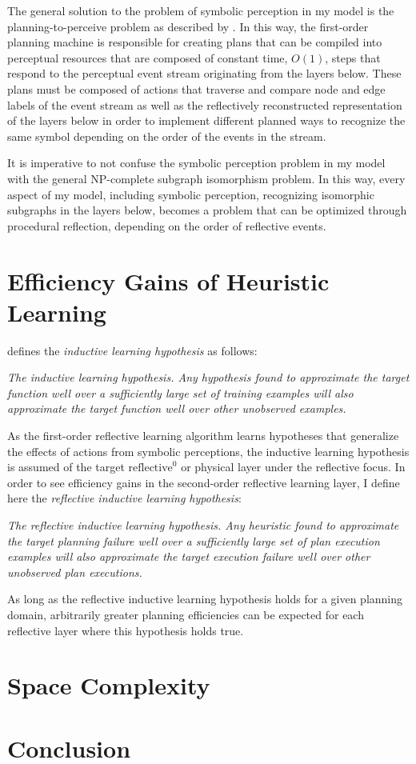The general solution to the problem of symbolic perception in my model
is the planning-to-perceive problem as described by
\cite{pryorcollins:1995}.  In this way, the first-order planning
machine is responsible for creating plans that can be compiled into
perceptual resources that are composed of constant time, $O(1)$, steps
that respond to the perceptual event stream originating from the
layers below.  These plans must be composed of actions that traverse
and compare node and edge labels of the event stream as well as the
reflectively reconstructed representation of the layers below in order
to implement different planned ways to recognize the same symbol
depending on the order of the events in the stream.

It is imperative to not confuse the symbolic perception problem in my
model with the general NP-complete subgraph isomorphism problem.  In
this way, every aspect of my model, including symbolic perception,
recognizing isomorphic subgraphs in the layers below, becomes a
problem that can be optimized through procedural reflection, depending
on the order of reflective events.

\section{Efficiency Gains of Heuristic Learning}

\cite{mitchell:1997} defines the \emph{inductive learning hypothesis}
as follows:
\begin{definition}\emph{
\emph{The inductive learning hypothesis.} Any hypothesis found to
approximate the target function well over a sufficiently large set of
training examples will also approximate the target function well over
other unobserved examples.  }\end{definition} As the first-order
reflective learning algorithm learns hypotheses that generalize the
effects of actions from symbolic perceptions, the inductive learning
hypothesis is assumed of the target $\text{reflective}^0$ or physical
layer under the reflective focus.  In order to see efficiency gains in
the second-order reflective learning layer, I define here the
\emph{reflective inductive learning hypothesis}:
\begin{definition}\emph{
\emph{The reflective inductive learning hypothesis.} Any heuristic
found to approximate the target planning failure well over a
sufficiently large set of plan execution examples will also
approximate the target execution failure well over other unobserved
plan executions.}\end{definition} As long as the reflective inductive
learning hypothesis holds for a given planning domain, arbitrarily
greater planning efficiencies can be expected for each reflective
layer where this hypothesis holds true.

\section{Space Complexity}

\section{Conclusion}



